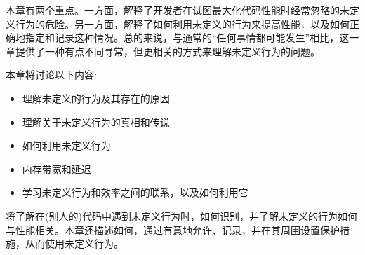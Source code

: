 本章有两个重点。一方面，解释了开发者在试图最大化代码性能时经常忽略的未定义行为的危险。另一方面，解释了如何利用未定义的行为来提高性能，以及如何正确地指定和记录这种情况。总的来说，与通常的“任何事情都可能发生”相比，这一章提供了一种有点不同寻常，但更相关的方式来理解未定义行为的问题。

本章将讨论以下内容:

\begin{itemize}
\item 
理解未定义的行为及其存在的原因

\item 
理解关于未定义行为的真相和传说

\item 
如何利用未定义行为

\item 
内存带宽和延迟

\item 
学习未定义行为和效率之间的联系，以及如何利用它
\end{itemize}

将了解在(别人的)代码中遇到未定义行为时，如何识别，并了解未定义的行为如何与性能相关。本章还描述如何，通过有意地允许、记录，并在其周围设置保护措施，从而使用未定义行为。